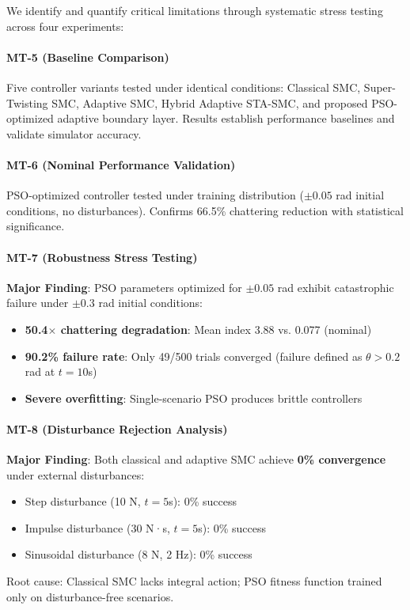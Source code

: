 We identify and quantify critical limitations through systematic stress testing across four experiments:

\paragraph{MT-5 (Baseline Comparison)}
Five controller variants tested under identical conditions: Classical SMC, Super-Twisting SMC, Adaptive SMC, Hybrid Adaptive STA-SMC, and proposed PSO-optimized adaptive boundary layer. Results establish performance baselines and validate simulator accuracy.

\paragraph{MT-6 (Nominal Performance Validation)}
PSO-optimized controller tested under training distribution ($\pm0.05$ rad initial conditions, no disturbances). Confirms 66.5\% chattering reduction with statistical significance.

\paragraph{MT-7 (Robustness Stress Testing)}
\textbf{Major Finding}: PSO parameters optimized for $\pm0.05$ rad exhibit catastrophic failure under $\pm0.3$ rad initial conditions:
\begin{itemize}
    \item \textbf{50.4$\times$ chattering degradation}: Mean index 3.88 vs. 0.077 (nominal)
    \item \textbf{90.2\% failure rate}: Only 49/500 trials converged (failure defined as $\theta > 0.2$ rad at $t=10$s)
    \item \textbf{Severe overfitting}: Single-scenario PSO produces brittle controllers
\end{itemize}

\paragraph{MT-8 (Disturbance Rejection Analysis)}
\textbf{Major Finding}: Both classical and adaptive SMC achieve \textbf{0\% convergence} under external disturbances:
\begin{itemize}
    \item Step disturbance (10 N, $t=5$s): 0\% success
    \item Impulse disturbance (30 N·s, $t=5$s): 0\% success
    \item Sinusoidal disturbance (8 N, 2 Hz): 0\% success
\end{itemize}
Root cause: Classical SMC lacks integral action; PSO fitness function trained only on disturbance-free scenarios.

